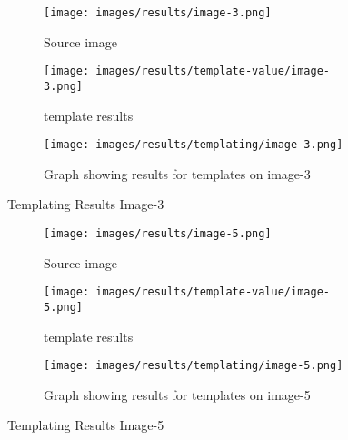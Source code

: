 \begin{figure}[H]
    \centering
    
    \begin{subfigure}{0.5\textwidth}
        \centering
        \texttt{[image: images/results/image-3.png]}
        \caption{Source image}
    \end{subfigure}%
    \begin{subfigure}{0.5\textwidth}
        \centering
        \texttt{[image: images/results/template-value/image-3.png]}
        \caption{template results}
    \end{subfigure}
    \begin{subfigure}{\textwidth}
    \centering
        \texttt{[image: images/results/templating/image-3.png]}
        \caption{Graph showing results for templates on image-3}
    \end{subfigure}
    
    \caption{Templating Results Image-3}
    \label{fig:Templating-Results-Image-3}
\end{figure}

\begin{figure}[H]
    \centering
    
    \begin{subfigure}{0.5\textwidth}
        \centering
        \texttt{[image: images/results/image-5.png]}
        \caption{Source image}
    \end{subfigure}%
    \begin{subfigure}{0.5\textwidth}
        \centering
        \texttt{[image: images/results/template-value/image-5.png]}
        \caption{template results}
    \end{subfigure}
    \begin{subfigure}{\textwidth}
    \centering
        \texttt{[image: images/results/templating/image-5.png]}
        \caption{Graph showing results for templates on image-5}
    \end{subfigure}
    
    \caption{Templating Results Image-5}
    \label{fig:Templating-Results-Image-5}
\end{figure}

